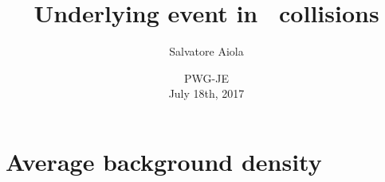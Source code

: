 \documentclass[xcolor={usenames,dvipsnames}]{beamer}
\title[Underlying event in \pp] %
{Underlying event in \pp\ collisions}
\author[Salvatore Aiola]%
{Salvatore Aiola}
\institute[Yale University] %
{Yale University}
\date[PWG-JE - July 18th, 2017] %
{PWG-JE \\
July 18th, 2017}
\begin{document}
\begin{frame}
  \titlepage
\end{frame}







\section{Average background density}
\end{document}
